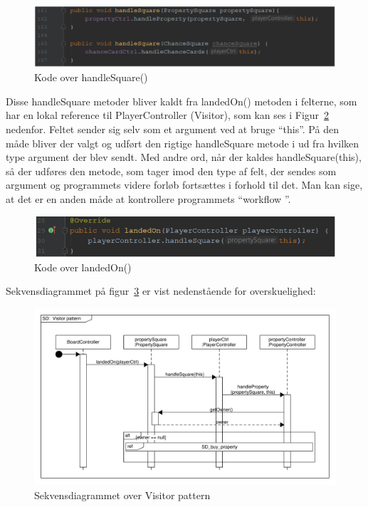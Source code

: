 \documentclass[class=article, crop=false]{standalone}
\begin{document}
        \begin{figure}[H]
        \centering
        \includegraphics[scale=0.5]{pics/handle_square.png}
        \caption{Kode over handleSquare()}\label{fig:handle_square}
    \end{figure}
        Disse handleSquare metoder bliver kaldt fra landedOn() metoden i felterne, som har en lokal reference til PlayerController (Visitor), som kan ses i Figur~\ref{fig:landed_on} nedenfor. Feltet sender sig selv som et argument ved at bruge “this”. På den måde bliver der valgt og udført den rigtige handleSquare metode i ud fra hvilken type argument der blev sendt. Med andre ord, når der kaldes handleSquare(this), så der udføres den metode, som tager imod den type af felt, der sendes som argument og programmets videre forløb fortsættes i forhold til det. Man kan sige, at det er en anden måde at kontrollere programmets “workflow ”.
        \begin{figure}[H]
            \centering
            \includegraphics[scale=0.6]{pics/landed_on.PNG}
            \caption{Kode over landedOn()}\label{fig:landed_on}
        \end{figure}

        Sekvensdiagrammet på figur~\ref{fig:SD_landed_on} er vist nedenstående for overskuelighed:


        \begin{figure}[H]
        \centering

        \hbox{\hspace{-1cm}\includegraphics[scale=0.6]{diagrams/SD_landed_on.pdf}}
        \caption{Sekvensdiagrammet over Visitor pattern}\label{fig:SD_landed_on}
    \end{figure}
\end{document}

